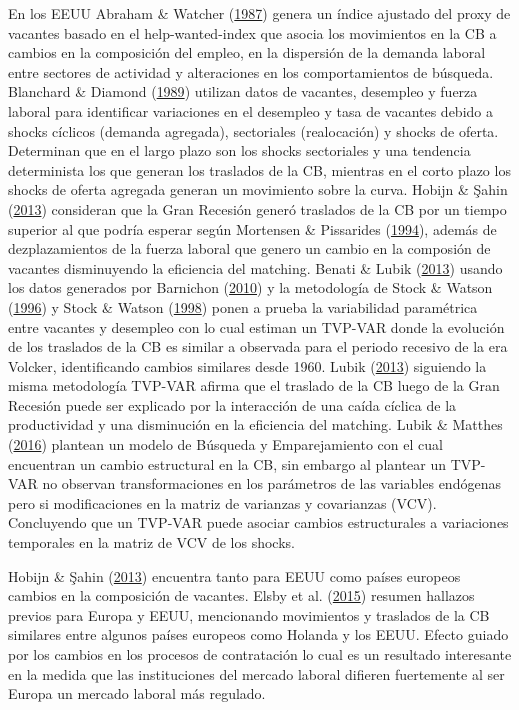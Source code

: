 \documentclass[12pt,oneside]{reedthesis}
\begin{document}
En los EEUU Abraham \& Watcher (\protect\hyperlink{ref-Abraham1987}{1987}) genera un índice ajustado del proxy de vacantes basado en el help-wanted-index que asocia los movimientos en la CB a cambios en la composición del empleo, en la dispersión de la demanda laboral entre sectores de actividad y alteraciones en los comportamientos de búsqueda. Blanchard \& Diamond (\protect\hyperlink{ref-Blanchard1989}{1989}) utilizan datos de vacantes, desempleo y fuerza laboral para identificar variaciones en el desempleo y tasa de vacantes debido a shocks cíclicos (demanda agregada), sectoriales (realocación) y shocks de oferta. Determinan que en el largo plazo son los shocks sectoriales y una tendencia determinista los que generan los traslados de la CB, mientras en el corto plazo los shocks de oferta agregada generan un movimiento sobre la curva. Hobijn \& Şahin (\protect\hyperlink{ref-Hobijn2013}{2013}) consideran que la Gran Recesión generó traslados de la CB por un tiempo superior al que podría esperar según Mortensen \& Pissarides (\protect\hyperlink{ref-Mortensen1994}{1994}), además de dezplazamientos de la fuerza laboral que genero un cambio en la composión de vacantes disminuyendo la eficiencia del matching.
Benati \& Lubik (\protect\hyperlink{ref-Benati2013}{2013}) usando los datos generados por Barnichon (\protect\hyperlink{ref-Barnichon2010}{2010}) y la metodología de Stock \& Watson (\protect\hyperlink{ref-Stock1996}{1996}) y Stock \& Watson (\protect\hyperlink{ref-Stock1998}{1998}) ponen a prueba la variabilidad paramétrica entre vacantes y desempleo con lo cual estiman un TVP-VAR donde la evolución de los traslados de la CB es similar a observada para el periodo recesivo de la era Volcker, identificando cambios similares desde 1960. Lubik (\protect\hyperlink{ref-Lubik2013}{2013}) siguiendo la misma metodología TVP-VAR afirma que el traslado de la CB luego de la Gran Recesión puede ser explicado por la interacción de una caída cíclica de la productividad y una disminución en la eficiencia del matching. Lubik \& Matthes (\protect\hyperlink{ref-Lubik2016}{2016}) plantean un modelo de Búsqueda y Emparejamiento con el cual encuentran un cambio estructural en la CB, sin embargo al plantear un TVP-VAR no observan transformaciones en los parámetros de las variables endógenas pero si modificaciones en la matriz de varianzas y covarianzas (VCV). Concluyendo que un TVP-VAR puede asociar cambios estructurales a variaciones temporales en la matriz de VCV de los shocks.

Hobijn \& Şahin (\protect\hyperlink{ref-Hobijn2013}{2013}) encuentra tanto para EEUU como países europeos cambios en la composición de vacantes. Elsby et al. (\protect\hyperlink{ref-Elsby2015}{2015}) resumen hallazos previos para Europa y EEUU, mencionando movimientos y traslados de la CB similares entre algunos países europeos como Holanda y los EEUU. Efecto guiado por los cambios en los procesos de contratación lo cual es un resultado interesante en la medida que las instituciones del mercado laboral difieren fuertemente al ser Europa un mercado laboral más regulado.
\end{document}
